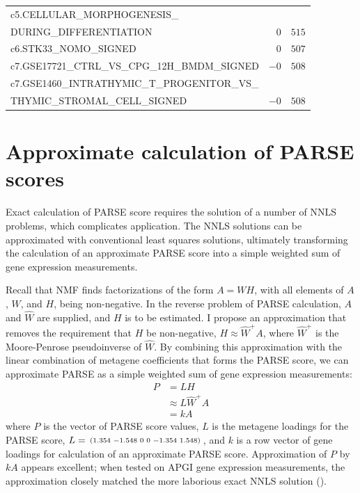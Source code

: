 \begin{longtable}[!htbp]{ l r@{.}l }
\qquad c5.CELLULAR\_MORPHOGENESIS\_                                     \\
\qquad DURING\_DIFFERENTIATION                      & $0$ & $515$       \\
c6.STK33\_NOMO\_SIGNED                              & $0$ & $507$       \\
c7.GSE17721\_CTRL\_VS\_CPG\_12H\_BMDM\_SIGNED       & $-0$ & $508$      \\
c7.GSE1460\_INTRATHYMIC\_T\_PROGENITOR\_VS\_                            \\
\qquad THYMIC\_STROMAL\_CELL\_SIGNED                & $-0$ & $508$      \\ 
\end{longtable}


\chapter{Approximate calculation of \texorpdfstring{\acrshort{PARSE}}{PARSE} scores}
\label{app:sigs-parse-approx}
Exact calculation of \gls{PARSE} score requires the solution of a number of \gls{NNLS} problems, which complicates application.  The \gls{NNLS} solutions can be approximated with conventional least squares solutions, ultimately transforming the calculation of an approximate \gls{PARSE} score into a simple weighted sum of gene expression measurements.

Recall that \gls{NMF} finds factorizations of the form $A = W H$, with all elements of $A$, $W$, and $H$, being non-negative.  In the reverse problem of \gls{PARSE} calculation, $A$ and $\widehat{W}$ are supplied, and $H$ is to be estimated.  I propose an approximation that removes the requirement that $H$ be non-negative, $H \approx \widehat{W}^+ A$, where $\widehat{W}^+$ is the Moore-Penrose pseudoinverse of $\widehat{W}$.  By combining this approximation with the linear combination of metagene coefficients that forms the \gls{PARSE} score, we can approximate \gls{PARSE} as a simple weighted sum of gene expression measurements:
\begin{align}
  P &= L H \\
    &\approx L \widehat{W}^+ A \\
    &= k A
\end{align}
where $P$ is the vector of \gls{PARSE} score values, $L$ is the metagene loadings for the \gls{PARSE} score, $L = \begin{smallmatrix}(1.354&-1.548&0&0&-1.354&1.548)\end{smallmatrix}$, and $k$ is a row vector of gene loadings for calculation of an approximate \gls{PARSE} score.  Approximation of $P$ by $k A$ appears excellent; when tested on \gls{APGI} gene expression measurements, the approximation closely matched the more laborious exact \gls{NNLS} solution ().

